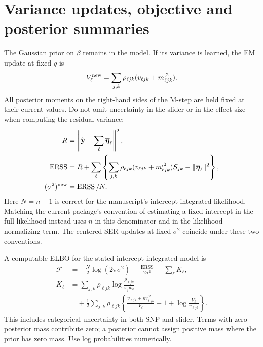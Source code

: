 \documentclass[11pt]{article}
\newcommand{\ERSS}{\operatorname{ERSS}}
\newcommand{\yb}{\widetilde{\mathbf y}}
\newcommand{\etal}{\overline{\boldsymbol\eta}}
\begin{document}
\section{Variance updates, objective and posterior summaries}
The Gaussian prior on $\beta$ remains in the model. If its variance is
learned, the EM update at fixed $q$ is
\begin{equation}
 V_\ell^{\rm new}=\sum_{j,k}\rho_{\ell jk}
                         (v_{\ell jk}+m_{\ell jk}^{,2}).
 \label{eq:Vupdate}
\end{equation}
All posterior moments on the right-hand sides of the M-step are held
fixed at their current values. Do not omit uncertainty in the slider or
in the effect size when computing the residual variance:
\begin{align}
 R&=\left\|\yb-\sum_\ell\etal_\ell\right\|^2,
 \nonumber\\
 \ERSS&=R+\sum_\ell\left\{
  \sum_{j,k}\rho_{\ell jk}(v_{\ell jk}+m_{\ell jk}^{,2})S_{jk}
                         -\|\etal_\ell\|^2\right\},\label{eq:erss}\\
 (\sigma^2)^{\rm new}&=\ERSS/N.\label{eq:sigma}
\end{align}
Here $N=n-1$ is correct for the manuscript's intercept-integrated
likelihood. Matching the current package's convention of estimating a
fixed intercept in the full likelihood instead uses $n$ in this
denominator and in the likelihood normalizing term. The centered SER
updates at fixed $\sigma^2$ coincide under these two conventions.

A computable ELBO for the stated intercept-integrated model is
\begin{align}
 \mathcal F&=-\frac N2\log(2\pi\sigma^2)-\frac{\ERSS}{2\sigma^2}
             -\sum_\ell K_\ell,\label{eq:elbo}\\
 K_\ell&=\sum_{j,k}\rho_{\ell jk}
               \log\frac{\rho_{\ell jk}}{\pi_jw_k}\nonumber\\
 &\quad+\frac12\sum_{j,k}\rho_{\ell jk}
 \left\{\frac{v_{\ell jk}+m_{\ell jk}^{,2}}{V_\ell}
                 -1+\log\frac{V_\ell}{v_{\ell jk}}\right\}.
 \label{eq:kl}
\end{align}
This includes categorical uncertainty in both SNP and slider. Terms with
zero posterior mass contribute zero; a posterior cannot assign positive
mass where the prior has zero mass. Use log probabilities numerically.
\end{document}
